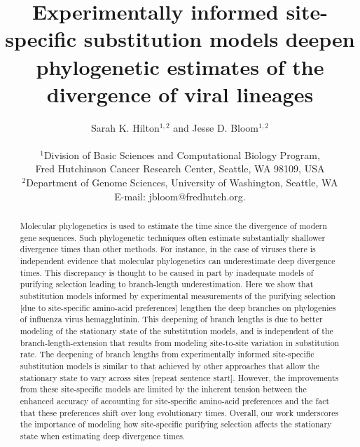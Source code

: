 \documentclass[11pt]{article}
\title{Experimentally informed site-specific substitution models deepen phylogenetic estimates of the divergence of viral lineages}
\author
{Sarah K. Hilton$^{1,2}$  and Jesse D. Bloom$^{1,2}$\\
\\
\normalsize{$^1$Division of Basic Sciences and Computational Biology Program,}\\
\normalsize{Fred Hutchinson Cancer Research Center, Seattle, WA 98109, USA}\\
\normalsize{$^2$Department of Genome Sciences, University of Washington, Seattle, WA}\\
\normalsize{E-mail:  jbloom@fredhutch.org.}\\
}
\date{}
\newcommand\skhcomment[1]{{\color{cyan}[#1]}}
\begin{document}
 


\maketitle 


\begin{abstract}
\noindent  
Molecular phylogenetics is used to estimate the time since the divergence of modern gene sequences.
Such phylogenetic techniques often estimate substantially shallower divergence times than other methods.
For instance, in the case of viruses there is independent evidence that molecular phylogenetics can underestimate deep divergence times.  
This discrepancy is thought to be caused in part by inadequate models of purifying selection leading to branch-length underestimation.
Here we show that substitution models informed by experimental measurements of the purifying selection \skhcomment{due to site-specific amino-acid preferences} lengthen the deep branches on phylogenies of influenza virus hemagglutinin.
This deepening of branch lengths is due to better modeling of the stationary state of the substitution models, and is independent of the branch-length-extension that results from modeling site-to-site variation in substitution rate.
The deepening of branch lengths from experimentally informed site-specific substitution models is similar to that achieved by other approaches that allow the stationary state to vary across sites \skhcomment{repeat sentence start}.
However, the improvements from these site-specific models are limited by the inherent tension between the enhanced accuracy of accounting for site-specific amino-acid preferences and the fact that these preferences shift over long evolutionary times.
Overall, our work underscores the importance of modeling how site-specific purifying selection affects the stationary state when estimating deep divergence times. 
\end{abstract}

\clearpage
\end{document}
